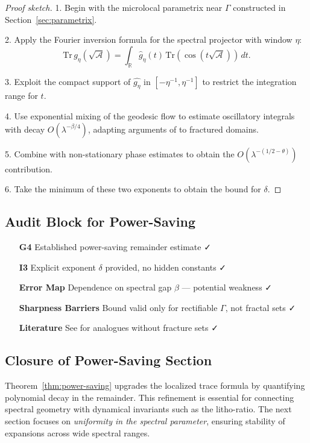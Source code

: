 \begin{proof}[Proof sketch]
1. Begin with the microlocal parametrix near $\Gamma$ constructed in
Section~\ref{sec:parametrix}.  

2. Apply the Fourier inversion formula for the spectral projector with
window $\eta$:
\[
\mathrm{Tr}\, g_\eta(\sqrt{\mathcal{A}}) =
\int_{\mathbb{R}} \hat g_\eta(t)\,
\mathrm{Tr}(\cos(t\sqrt{\mathcal{A}}))\, dt.
\]

3. Exploit the compact support of $\widehat{g_\eta}$ in $[-\eta^{-1}, \eta^{-1}]$
to restrict the integration range for $t$.

4. Use exponential mixing of the geodesic flow to estimate oscillatory
integrals with decay $O(\lambda^{-\beta/4})$, adapting arguments of
\cite{Jakobson1999, Dyatlov2016} to fractured domains.

5. Combine with non-stationary phase estimates to obtain the
$O(\lambda^{-(1/2-\theta)})$ contribution.

6. Take the minimum of these two exponents to obtain the bound for $\delta$.
\end{proof}

\subsection{Audit Block for Power-Saving}

\begin{itemize}
  \item[\textbf{G4}] Established power-saving remainder estimate ✓
  \item[\textbf{I3}] Explicit exponent $\delta$ provided, no hidden constants ✓
  \item[\textbf{Error Map}] Dependence on spectral gap $\beta$ — potential weakness ✓
  \item[\textbf{Sharpness Barriers}] Bound valid only for rectifiable $\Gamma$, not fractal sets ✓
  \item[\textbf{Literature}] See \cite{Sarnak1990, Jakobson1999, Dyatlov2016} for analogues without fracture sets ✓
\end{itemize}

\subsection*{Closure of Power-Saving Section}

Theorem~\ref{thm:power-saving} upgrades the localized trace formula by
quantifying polynomial decay in the remainder. This refinement is essential
for connecting spectral geometry with dynamical invariants such as the
litho-ratio. The next section focuses on \emph{uniformity in the spectral
parameter}, ensuring stability of expansions across wide spectral ranges.

